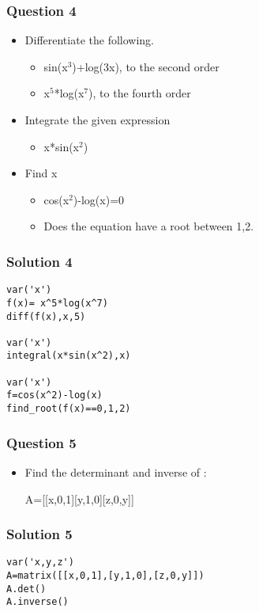 \documentclass[presentation]{beamer}
\begin{document}
\begin{frame}
\frametitle{Question 4}
\label{sec-8}

\begin{itemize}
\item Differentiate the following.

\begin{itemize}
\item sin(x$^3$)+log(3x), to the second order
\item x$^5$*log(x$^7$), to the fourth order
\end{itemize}

\item Integrate the given expression

\begin{itemize}
\item x*sin(x$^2$)
\end{itemize}

\item Find x

\begin{itemize}
\item cos(x$^2$)-log(x)=0
\item Does the equation have a root between 1,2.
\end{itemize}

\end{itemize}
\end{frame}
\begin{frame}[fragile]
\frametitle{Solution 4}
\label{sec-9}

\lstset{language=Python}
\begin{lstlisting}
var('x')
f(x)= x^5*log(x^7) 
diff(f(x),x,5)

var('x')
integral(x*sin(x^2),x) 

var('x')
f=cos(x^2)-log(x)
find_root(f(x)==0,1,2)
\end{lstlisting}
\end{frame}
\begin{frame}
\frametitle{Question 5}
\label{sec-10}

\begin{itemize}
\item Find the determinant and inverse of :

      A=[[x,0,1][y,1,0][z,0,y]]
\end{itemize}
\end{frame}
\begin{frame}[fragile]
\frametitle{Solution 5}
\label{sec-11}

\lstset{language=Python}
\begin{lstlisting}
var('x,y,z')
A=matrix([[x,0,1],[y,1,0],[z,0,y]])
A.det()
A.inverse()
\end{lstlisting}
\end{frame}
\end{document}
